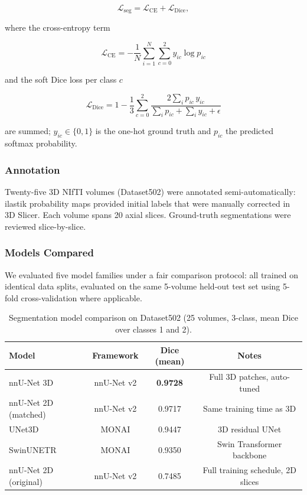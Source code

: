 \documentclass[11pt,a4paper]{article}
\begin{document}
\begin{equation}
    \mathcal{L}_{\text{seg}} = \mathcal{L}_{\text{CE}} + \mathcal{L}_{\text{Dice}},
\end{equation}

where the cross-entropy term

\begin{equation}
    \mathcal{L}_{\text{CE}} = -\frac{1}{N}\sum_{i=1}^{N} \sum_{c=0}^{2} y_{ic}\log p_{ic}
\end{equation}

and the soft Dice loss per class $c$

\begin{equation}
    \mathcal{L}_{\text{Dice}} = 1 - \frac{1}{3}\sum_{c=0}^{2} \frac{2\sum_i p_{ic}\,y_{ic}}{\sum_i p_{ic} + \sum_i y_{ic} + \epsilon}
\end{equation}

are summed; $y_{ic} \in \{0,1\}$ is the one-hot ground truth and $p_{ic}$ the predicted softmax probability.

\subsubsection{Annotation}

Twenty-five 3D NIfTI volumes (Dataset502) were annotated semi-automatically: ilastik probability maps provided initial labels that were manually corrected in 3D Slicer. Each volume spans 20 axial slices. Ground-truth segmentations were reviewed slice-by-slice.

\subsubsection{Models Compared}

We evaluated five model families under a fair comparison protocol: all trained on identical data splits, evaluated on the same 5-volume held-out test set using 5-fold cross-validation where applicable.

\begin{table}[H]
\centering
\begin{tabular}{lccc}
\toprule
Model & Framework & Dice (mean) & Notes \\
\midrule
nnU-Net 3D & nnU-Net v2 & \textbf{0.9728} & Full 3D patches, auto-tuned \\
nnU-Net 2D (matched) & nnU-Net v2 & 0.9717 & Same training time as 3D \\
UNet3D & MONAI & 0.9447 & 3D residual UNet \\
SwinUNETR & MONAI & 0.9350 & Swin Transformer backbone \\
nnU-Net 2D (original) & nnU-Net v2 & 0.7485 & Full training schedule, 2D slices \\
\bottomrule
\end{tabular}
\caption{Segmentation model comparison on Dataset502 (25 volumes, 3-class, mean Dice over classes 1 and 2).}
\label{tab:seg_results}
\end{table}
\end{document}
